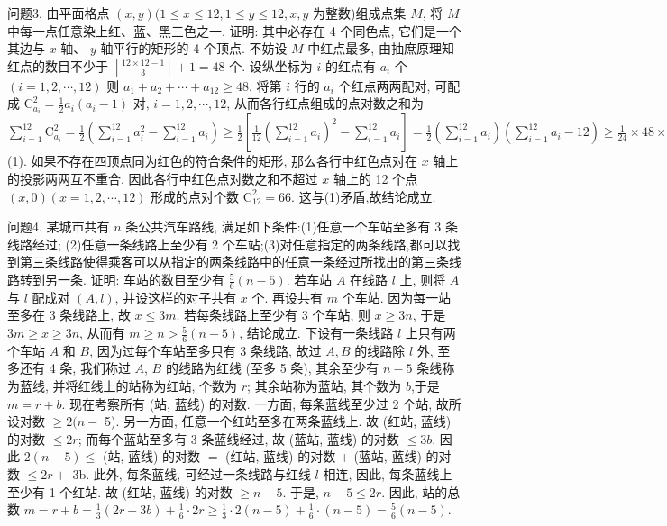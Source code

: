 问题3. 由平面格点 $(x, y)(1 \leqslant x \leqslant 12,1 \leqslant y \leqslant 12, x, y$ 为整数)组成点集 $M$, 将 $M$ 中每一点任意染上红、蓝、黑三色之一.
证明: 其中必存在 4 个同色点, 它们是一个其边与 $x$ 轴、 $y$ 轴平行的矩形的 4 个顶点.
不妨设 $M$ 中红点最多, 由抽庶原理知红点的数目不少于 $\left[\frac{12 \times 12-1}{3}\right]+1=48$ 个.
设纵坐标为 $i$ 的红点有 $a_i$ 个 $(i=1,2, \cdots, 12)$ 则 $a_1+a_2+\cdots+a_{12} \geqslant 48$. 将第 $i$ 行的 $a_i$ 个红点两两配对, 可配成 $\mathrm{C}_{a_i}^2=\frac{1}{2} a_i\left(a_i-1\right)$  对, $i=1,2, \cdots, 12$, 从而各行红点组成的点对数之和为 $\sum_{i=1}^{12} \mathrm{C}_{a_i}^2= \frac{1}{2}\left(\sum_{i=1}^{12} a_i^2-\sum_{i=1}^{12} a_i\right) \geqslant \frac{1}{2}\left[\frac{1}{12}\left(\sum_{i=1}^{12} a_i\right)^2-\sum_{i=1}^{12} a_i\right]=\frac{1}{2}\left(\sum_{i=1}^{12} a_i\right)\left(\sum_{i=1}^{12} a_i-12\right) \geqslant \frac{1}{24} \times 48 \times(48-12)=72 \cdots$ (1). 
如果不存在四顶点同为红色的符合条件的矩形, 那么各行中红色点对在 $x$ 轴上的投影两两互不重合, 因此各行中红色点对数之和不超过 $x$ 轴上的 12 个点 $(x, 0)(x=1,2, \cdots, 12)$ 形成的点对个数 $\mathrm{C}_{12}^2=66$. 这与(1)矛盾,故结论成立.



问题4. 某城市共有 $n$ 条公共汽车路线, 满足如下条件:(1)任意一个车站至多有 3 条线路经过; (2)任意一条线路上至少有 2 个车站;(3)对任意指定的两条线路,都可以找到第三条线路使得乘客可以从指定的两条线路中的任意一条经过所找出的第三条线路转到另一条.
证明: 车站的数目至少有 $\frac{5}{6}(n-5)$. 
若车站 $A$ 在线路 $l$ 上, 则将 $A$ 与 $l$ 配成对 $(A, l)$, 并设这样的对子共有 $x$ 个.
再设共有 $m$ 个车站.
因为每一站至多在 3 条线路上, 故 $x \leqslant 3 m$. 若每条线路上至少有 3 个车站, 则 $x \geqslant 3 n$, 于是 $3 m \geqslant x \geqslant 3 n$, 从而有 $m \geqslant n> \frac{5}{6}(n-5)$, 结论成立.
下设有一条线路 $l$ 上只有两个车站 $A$ 和 $B$, 因为过每个车站至多只有 3 条线路, 故过 $A, B$ 的线路除 $l$ 外, 至多还有 4 条, 我们称过 $A$, $B$ 的线路为红线 (至多 5 条), 其余至少有 $n-5$ 条线称为蓝线, 并将红线上的站称为红站, 个数为 $r$; 其余站称为蓝站, 其个数为 $b$,于是 $m=r+b$. 现在考察所有 (站, 蓝线) 的对数.
一方面, 每条蓝线至少过 2 个站, 故所设对数 $\geqslant 2(n-$ 5). 另一方面, 任意一个红站至多在两条蓝线上.
故 (红站, 蓝线) 的对数 $\leqslant 2 r$; 而每个蓝站至多有 3 条蓝线经过, 故 (蓝站, 蓝线) 的对数 $\leqslant 3 b$. 因此 $2(n- 5) \leqslant$ (站, 蓝线) 的对数 $=$ (红站, 蓝线) 的对数 + (蓝站, 蓝线) 的对数 $\leqslant 2 r+$ 3b. 此外, 每条蓝线, 可经过一条线路与红线 $l$ 相连, 因此, 每条蓝线上至少有 1 个红站.
故 (红站, 蓝线) 的对数 $\geqslant n-5$. 于是, $n-5 \leqslant 2 r$. 因此, 站的总数 $m= r+b=\frac{1}{3}(2 r+3 b)+\frac{1}{6} \cdot 2 r \geqslant \frac{1}{3} \cdot 2(n-5)+\frac{1}{6} \cdot(n-5)=\frac{5}{6}(n-5)$.



